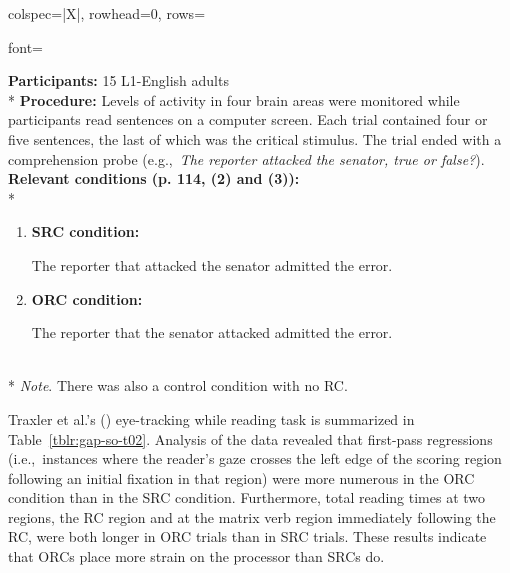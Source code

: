 \begin{longtblr}[caption={\textcite{just.etal1996}: fMRI experiment}, label={tblr:gap-so-j96}]{colspec={|X|}, rowhead=0, rows={font=\raggedright{}}}\hline
\textbf{Participants:} 15 L1-English adults \vspace{5pt}\\*
\textbf{Procedure:} Levels of activity in four brain areas were monitored while participants read sentences on a computer screen. Each trial contained four or five sentences, the last of which was the critical stimulus. The trial ended with a comprehension probe (e.g.,~\textit{The reporter attacked the senator, true or false?}). \vspace{5pt}\\
\textbf{Relevant conditions (p. 114, (2) and (3)):} \vspace{5pt}\\*
\begin{varwidth}{\linewidth}\begin{enumerate}[\bfseries (a),itemsep=5pt] 
\item \textbf{SRC condition:}\par\nobreak
The reporter that attacked the senator admitted the error.
\item \textbf{ORC condition:}\par\nobreak
The reporter that the senator attacked admitted the error.
\end{enumerate}\end{varwidth}\vspace{5pt}\\*
\textit{Note}. There was also a control condition with no RC.\\\hline
\end{longtblr}

Traxler et al.'s (\citeyear{traxler.etal2002}) eye-tracking while reading task is summarized in Table~\ref{tblr:gap-so-t02}. Analysis of the data revealed that first-pass regressions (i.e.,~instances where the reader's gaze crosses the left edge of the scoring region following an initial fixation in that region) were more numerous in the ORC condition than in the SRC condition. Furthermore, total reading times at two regions, the RC region and at the matrix verb region immediately following the RC, were both longer in ORC trials than in SRC trials. These results indicate that ORCs place more strain on the processor than SRCs do.

